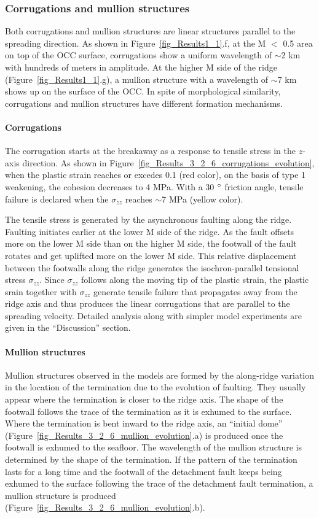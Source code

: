 \documentclass[draft,gc]{agutex}
\begin{document}
\begin{article}
\subsubsection{Corrugations and mullion structures}
Both corrugations and mullion structures are linear structures parallel to the spreading direction. As shown in Figure~\ref{fig_Results1_1}.f, at the M $<$ 0.5 area on top of the OCC surface, corrugations show a uniform wavelength of $\sim$2 km with hundreds of meters in amplitude. At the higher M side of the ridge (Figure~\ref{fig_Results1_1}.g), a mullion structure with a wavelength of $\sim$7 km shows up on the surface of the OCC. In spite of morphological similarity, corrugations and mullion structures have different formation mechanisms.

\paragraph{Corrugations}
The corrugation starts at the breakaway as a response to tensile stress in the $z$-axis direction. As shown in Figure~\ref{fig_Results_3_2_6_corrugations_evolution}, when the plastic strain reaches or excedes 0.1 (red color), on the basis of type 1 weakening, the cohesion decreases to 4 MPa. With a 30 $\degree$ friction angle, tensile failure is declared when the $\sigma_{zz}$ reaches $\sim$7 MPa (yellow color).

The tensile stress is generated by the asynchronous faulting along the ridge. Faulting initiates earlier at the lower M side of the ridge. As the fault offsets more on the lower M side than on the higher M side, the footwall of the fault rotates and get uplifted more on the lower M side. This relative displacement between the footwalls along the ridge generates the isochron-parallel tensional stress $\sigma_{zz}$. Since $\sigma_{zz}$ follows along the moving tip of the plastic strain, the plastic srain together with $\sigma_{zz}$ generate tensile failure that propagates away from the ridge axis and thus produces the linear corrugations that are parallel to the spreading velocity. Detailed analysis along with simpler model experiments are given in the ``Discussion'' section.

\paragraph{Mullion structures}
Mullion structures observed in the models are formed by the along-ridge variation in the location of the termination due to the evolution of faulting. They usually appear where the termination is closer to the ridge axis. The shape of the footwall follows the trace of the termination as it is exhumed to the surface. Where the termination is bent inward to the ridge axis, an ``initial dome'' (Figure~\ref{fig_Results_3_2_6_mullion_evolution}.a) is produced once the footwall is exhumed to the seafloor. The wavelength of the mullion structure is determined by the shape of the termination. If the pattern of the termination lasts for a long time and the footwall of the detachment fault keeps being exhumed to the surface following the trace of the detachment fault termination, a mullion structure is produced (Figure~\ref{fig_Results_3_2_6_mullion_evolution}.b).


\end{article}
\end{document}
